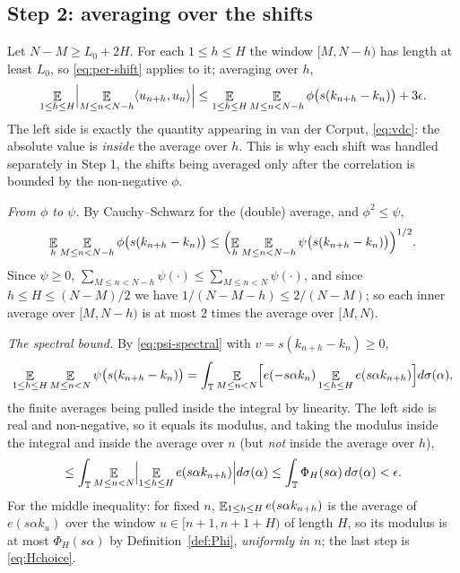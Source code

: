 \subsection*{Step 2: averaging over the shifts}

Let $N - M \geq L_0 + 2H$.  For each $1 \leq h \leq H$ the window $[M, N-h)$ has length at
least $L_0$, so \eqref{eq:per-shift} applies to it; averaging over $h$,
\begin{equation}
  \label{eq:shift-average}
  \mathop{\mathbb{E}}_{1 \leq h \leq H} \Bigl\lvert \mathop{\mathbb{E}}_{M \leq n < N-h} \langle u_{n+h},u_n\rangle \Bigr\rvert
    \leq \mathop{\mathbb{E}}_{1 \leq h \leq H} \mathop{\mathbb{E}}_{M \leq n < N-h} \phi\bigl(s(k_{n+h}-k_n)\bigr) + 3\epsilon .
\end{equation}
The left side is exactly the quantity appearing in van der Corput, \eqref{eq:vdc}: the absolute
value is \emph{inside} the average over $h$.  This is why each shift was handled separately in
Step 1, the shifts being averaged only after the correlation is bounded by the non-negative
$\phi$.

\emph{From $\phi$ to $\psi$.}  By Cauchy--Schwarz for the (double) average, and $\phi^2 \leq \psi$,
\[
  \mathop{\mathbb{E}}_{h} \mathop{\mathbb{E}}_{M \leq n < N-h} \phi\bigl(s(k_{n+h}-k_n)\bigr)
    \leq \Bigl( \mathop{\mathbb{E}}_{h} \mathop{\mathbb{E}}_{M \leq n < N-h} \psi\bigl(s(k_{n+h}-k_n)\bigr) \Bigr)^{1/2} .
\]
Since $\psi \geq 0$, $\sum_{M \leq n < N-h} \psi(\cdot) \leq \sum_{M \leq n < N}\psi(\cdot)$, and
since $h \leq H \leq (N-M)/2$ we have $1/(N-M-h) \leq 2/(N-M)$; so each inner average over
$[M,N-h)$ is at most $2$ times the average over $[M,N)$.

\emph{The spectral bound.}  By \eqref{eq:psi-spectral} with $v = s(k_{n+h}-k_n) \geq 0$,
\[
  \mathop{\mathbb{E}}_{1 \leq h \leq H} \mathop{\mathbb{E}}_{M \leq n < N} \psi\bigl(s(k_{n+h}-k_n)\bigr)
    = \int_{\mathbb{T}} \mathop{\mathbb{E}}_{M\leq n<N} \Bigl[ e(-s\alpha k_n) \mathop{\mathbb{E}}_{1\leq h\leq H} e(s\alpha k_{n+h}) \Bigr] d\sigma(\alpha) ,
\]
the finite averages being pulled inside the integral by linearity.  The left side is real and
non-negative, so it equals its modulus, and taking the modulus inside the integral and inside
the average over $n$ (but \emph{not} inside the average over $h$),
\[
  \leq \int_{\mathbb{T}} \mathop{\mathbb{E}}_{M\leq n<N} \Bigl\lvert \mathop{\mathbb{E}}_{1\leq h\leq H} e(s\alpha k_{n+h}) \Bigr\rvert d\sigma(\alpha)
  \leq \int_{\mathbb{T}} \Phi_H(s\alpha)\, d\sigma(\alpha) < \epsilon .
\]
For the middle inequality: for fixed $n$, $\mathop{\mathbb{E}}_{1\leq h\leq H} e(s\alpha k_{n+h})$ is the
average of $e(s\alpha k_u)$ over the window $u \in [n+1, n+1+H)$ of length $H$, so its modulus
is at most $\Phi_H(s\alpha)$ by Definition~\ref{def:Phi}, \emph{uniformly in $n$}; the last step
is \eqref{eq:Hchoice}.

